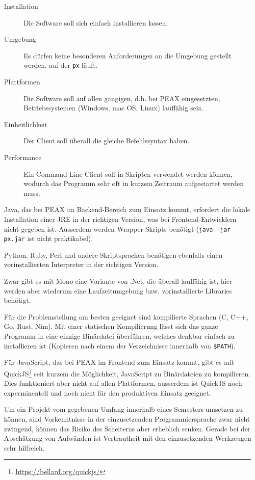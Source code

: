 \begin{description}
    \item[Installation] Die Software soll sich einfach installieren lassen.
    \item[Umgebung] Es dürfen keine besonderen Anforderungen an die Umgebung gestellt werden, auf der \texttt{px} läuft.
    \item[Plattformen] Die Software soll auf allen gängigen, d.h. bei PEAX eingesetzten, Betriebssystemen (Windows, mac OS, Linux) lauffähig sein.
    \item[Einheitlichkeit] Der Client soll überall die gleiche Befehlssyntax haben.
    \item[Performance] Ein Command Line Client soll in Skripten verwendet werden können, wodurch das Programm sehr oft in kurzem Zeitraum aufgestartet werden muss.
\end{description}

Java, das bei PEAX im Backend-Bereich zum Einsatz kommt, erfordert die lokale Installation einer JRE in der richtigen Version, was bei Frontend-Entwicklern nicht gegeben ist. Ausserdem werden Wrapper-Skripts benötigt (\texttt{java -jar px.jar} ist nicht praktikabel).

Python, Ruby, Perl und andere Skriptsprachen benötigen ebenfalls einen vorinstallierten Interpreter in der richtigen Version.

Zwar gibt es mit Mono eine Variante von .Net, die überall lauffähig ist, hier werden aber wiederum eine Laufzeitumgebung bzw. vorinstallierte Libraries benötigt.

Für die Problemstellung am besten geeignet sind kompilierte Sprachen (C, C++, Go, Rust, Nim). Mit einer statischen Kompilierung lässt sich das ganze Programm in eine einzige Binärdatei überführen, welches denkbar einfach zu installieren ist (Kopieren nach einem der Verzeichnisse innerhalb von \texttt{\$PATH}).

Für JavaScript, das bei PEAX im Frontend zum Einsatz kommt, gibt es mit QuickJS\footnote{\url{https://bellard.org/quickjs/}} seit kurzem die Möglichkeit, JavaScript zu Binärdateien zu kompilieren. Dies funktioniert aber nicht auf allen Plattformen, ausserdem ist QuickJS noch experminentell und noch nicht für den produktiven Einsatz geeignet.

Um ein Projekt vom gegebenen Umfang innerhalb eines Semesters umsetzen zu können, sind Vorkenntnisse in der einzusetzenden Programmiersprache zwar nicht zwingend, können das Risiko des Scheiterns aber erheblich senken. Gerade bei der Abschätzung von Aufwänden ist Vertrautheit mit den einzusetzenden Werkzeugen sehr hilfreich.

